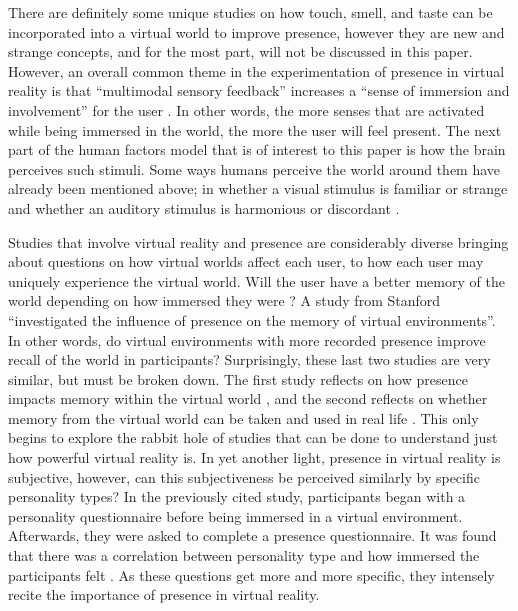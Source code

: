 \documentclass[manuscript,screen,review]{acmart}
\begin{document}
There are definitely some unique studies on how touch, smell, and taste can be incorporated into a virtual world to improve presence, however they are new and strange concepts, and for the most part, will not be discussed in this paper. However, an overall common theme in the experimentation of presence in virtual reality is that “multimodal sensory feedback” increases a “sense of immersion and involvement” for the user \cite{COOPER}. In other words, the more senses that are activated while being immersed in the world, the more the user will feel present. The next part of the human factors model that is of interest to this paper is how the brain perceives such stimuli. Some ways humans perceive the world around them have already been mentioned above; in whether a visual stimulus is familiar or strange and whether an auditory stimulus is harmonious or discordant \cite{MACKENZIE}.

Studies that involve virtual reality and presence are considerably diverse bringing about questions on how virtual worlds affect each user, to how each user may uniquely experience the virtual world. Will the user have a better memory of the world depending on how immersed they were \cite{SMITH}? A study from Stanford “investigated the influence of presence on the memory of virtual environments”. In other words, do virtual environments with more recorded presence improve recall  of the world in participants? \cite{BAILEY} Surprisingly, these last two studies are very similar, but must be broken down. The first study reflects on how presence impacts memory within the virtual world \cite{SMITH}, and the second reflects on whether memory from the virtual world can be taken and used in real life \cite{BAILEY}. This only begins to explore the rabbit hole of studies that can be done to understand just how powerful virtual reality is. In yet another light, presence in virtual reality is subjective, however, can this subjectiveness be perceived similarly by specific personality types? \cite{KOBER} In the previously cited study, participants began with a personality questionnaire before being immersed in a virtual environment. Afterwards, they were asked to complete a presence questionnaire. It was found that there was a correlation between personality type and how immersed the participants felt \cite{KOBER}. As these questions get more and more specific, they intensely recite the importance of presence in virtual reality.
\end{document}
